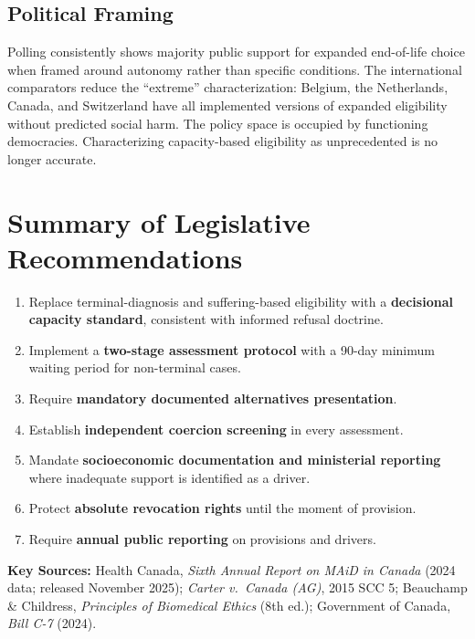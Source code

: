 \documentclass[11pt, letterpaper]{article}
\begin{document}
\subsection{Political Framing}

Polling consistently shows majority public support for expanded end-of-life choice when
framed around autonomy rather than specific conditions. The international comparators reduce
the ``extreme'' characterization: Belgium, the Netherlands, Canada, and Switzerland have all
implemented versions of expanded eligibility without predicted social harm. The policy space
is occupied by functioning democracies. Characterizing capacity-based eligibility as
unprecedented is no longer accurate.

\section*{Summary of Legislative Recommendations}

\begin{enumerate}
  \item Replace terminal-diagnosis and suffering-based eligibility with a
    \textbf{decisional capacity standard}, consistent with informed refusal doctrine.
  \item Implement a \textbf{two-stage assessment protocol} with a 90-day minimum
    waiting period for non-terminal cases.
  \item Require \textbf{mandatory documented alternatives presentation}.
  \item Establish \textbf{independent coercion screening} in every assessment.
  \item Mandate \textbf{socioeconomic documentation and ministerial reporting}
    where inadequate support is identified as a driver.
  \item Protect \textbf{absolute revocation rights} until the moment of provision.
  \item Require \textbf{annual public reporting} on provisions and drivers.
\end{enumerate}

\bigskip

{\small\sffamily\color{C@midgray}
\textbf{Key Sources:} Health Canada, \textit{Sixth Annual Report on MAiD in Canada} (2024 data; released November 2025);
\textit{Carter v.\ Canada (AG)}, 2015 SCC 5; Beauchamp \& Childress,
\textit{Principles of Biomedical Ethics} (8th ed.); Government of Canada,
\textit{Bill C-7} (2024).}
\end{document}
